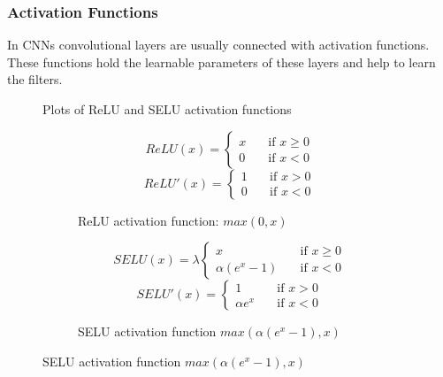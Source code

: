 \subsubsection{Activation Functions}
\label{activations}
In \glspl{CNN} convolutional layers are usually connected with activation functions.
These functions hold the learnable parameters of these layers and help to learn the filters.

\begin{figure}[ht]
\centering
\caption{Plots of ReLU and SELU activation functions}
\end{figure}
\begin{figure}[ht]
\begin{subfigure}{.45\textwidth}
\[ ReLU(x) =
  \begin{cases}
    x       & \quad \text{if } x \geq 0\\
    0  & \quad \text{if } x < 0
  \end{cases}
\]
\[ ReLU'(x) =
  \begin{cases}
    1       & \quad \text{if } x > 0\\
    0  & \quad \text{if } x < 0
  \end{cases}
\]
\caption{\gls{ReLU} activation function: $max(0,x)$}\label{fig:ReLU}
\end{subfigure}
\begin{subfigure}{.55\textwidth}
\[ SELU(x) = \lambda
  \begin{cases}
    x       & \quad \text{if } x \geq 0\\
    \alpha (e^x-1) & \quad \text{if } x < 0
  \end{cases}
\]
\[ SELU'(x) =
  \begin{cases}
    1       & \quad \text{if } x > 0\\
    \alpha e^x  & \quad \text{if } x < 0
  \end{cases}
\]
\caption{SELU activation function $max(\alpha (e^x-1),x)$}\label{fig:SELU}
\end{subfigure}
\label{fig:fig}
\end{figure}

